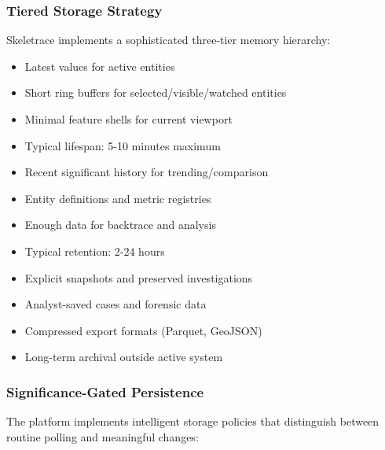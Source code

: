 \documentclass[12pt,a4paper]{article}
\begin{document}
\subsubsection{Tiered Storage Strategy}
Skeletrace implements a sophisticated three-tier memory hierarchy:

\begin{tcolorbox}[colback=osintgreen!10,colframe=osintgreen,title=Hot Memory (RAM)]
\begin{itemize}
\item Latest values for active entities
\item Short ring buffers for selected/visible/watched entities
\item Minimal feature shells for current viewport
\item Typical lifespan: 5-10 minutes maximum
\end{itemize}
\end{tcolorbox}

\begin{tcolorbox}[colback=orange!10,colframe=orange,title=Warm Storage (SQLite)]
\begin{itemize}
\item Recent significant history for trending/comparison
\item Entity definitions and metric registries
\item Enough data for backtrace and analysis
\item Typical retention: 2-24 hours
\end{itemize}
\end{tcolorbox}

\begin{tcolorbox}[colback=blue!10,colframe=blue,title=Cold Storage (Exports)]
\begin{itemize}
\item Explicit snapshots and preserved investigations
\item Analyst-saved cases and forensic data
\item Compressed export formats (Parquet, GeoJSON)
\item Long-term archival outside active system
\end{itemize}
\end{tcolorbox}

\subsubsection{Significance-Gated Persistence}
The platform implements intelligent storage policies that distinguish between routine polling and meaningful changes:
\end{document}
